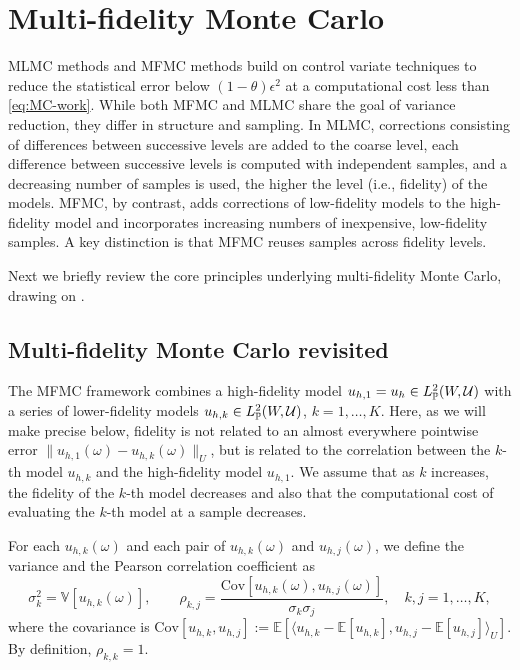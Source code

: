 

\section{Multi-fidelity Monte Carlo}\label{sec:MFMC}
%
MLMC methods \cite{MBGiles_2015a,SHeinrich_2001a} and 
MFMC methods  \cite{BPeherstorfer_KWillcox_MDGunzburger_2016a, BPeherstorfer_KWillcox_MDGunzburger_2018b} 
build on control variate techniques to reduce the statistical error below $(1-\theta)\epsilon^2$  
at a computational cost less than \eqref{eq:MC-work}.
While both MFMC and MLMC share the goal of variance reduction, they differ in structure and sampling.
In MLMC, corrections consisting of differences between successive levels are added to the coarse level, 
each difference between successive levels is computed with independent samples,
and a decreasing number of samples is used, the higher the level (i.e., fidelity) of the models.
MFMC, by contrast, adds corrections of low-fidelity models to the high-fidelity model and incorporates increasing numbers of inexpensive, low-fidelity samples. 
A key distinction is that MFMC reuses samples across fidelity levels. 

Next we briefly review the core principles underlying multi-fidelity Monte Carlo, drawing on \cite{BPeherstorfer_KWillcox_MDGunzburger_2016a}.  


\subsection{Multi-fidelity Monte Carlo revisited}
The MFMC framework combines a high-fidelity model $u_{h,1} = u_h \in L_{\mathbb{P}}^2(W, \mathcal{U})$ 
with a series of lower-fidelity models $u_{h,k} \in L_{\mathbb{P}}^2(W, \mathcal{U})$, $k =1,\dots, K$.
Here, as we will make precise below,
fidelity is not related to an almost everywhere pointwise error $\| u_{h,1}(\omega) - u_{h,k}(\omega) \|_U$,
but is related to the correlation between the $k$-th model $u_{h,k}$ and the high-fidelity model $u_{h,1}$.
We assume that as $k$ increases, the fidelity of the $k$-th model decreases and also
that the computational cost of evaluating the $k$-th model at a sample decreases.



For each  $u_{h,k}(\omega)$  and each pair of $u_{h,k}(\omega)$ and $u_{h,j}(\omega)$, 
we define the variance and the Pearson correlation coefficient as
\begin{equation*}
    \sigma_k^2 = \mathbb{V}\left[u_{h,k}(\omega)\right],\qquad \rho_{k,j} 
                       = \frac{\text{Cov}\left[ u_{h,k}(\omega), u_{h,j}(\omega)\right]}{\sigma_k\sigma_j}, \quad k,j=1,\dots, K,
\end{equation*}
where the covariance is 
$\text{Cov}[u_{h,k}, u_{h,j}] := \mathbb{E}[\langle u_{h,k} - \mathbb{E}[u_{h,k}], u_{h,j} - \mathbb{E}[u_{h,j}]\rangle_U]$.
By definition, $\rho_{k,k}=1$. 

